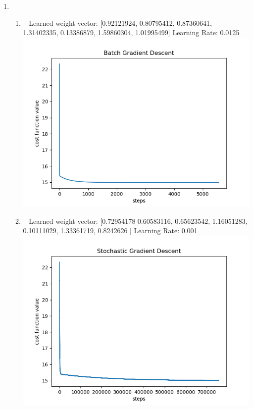 \documentclass[12pt, fullpage,letterpaper]{article}
\begin{document}
\begin{enumerate}
\begin{enumerate}
\end{enumerate}

	\item~
	
	\begin{enumerate}
		\item~
		\newline Learned weight vector: [0.92121924, 0.80795412, 0.87360641, 1.31402335, 0.13386879, 1.59860304, 1.01995499]
		\newline Learning Rate: 0.0125
		\newline \includegraphics{gradient_descent.png}
		\item~
		\newline Learned weight vector: [0.72954178 0.60583116, 0.65623542, 1.16051283, 0.10111029, 1.33361719, 0.8242626 ]
		\newline Learning Rate: 0.001
		\newline \includegraphics{stochastic_gradient.png}

\end{enumerate}
\end{enumerate}
\end{document}
